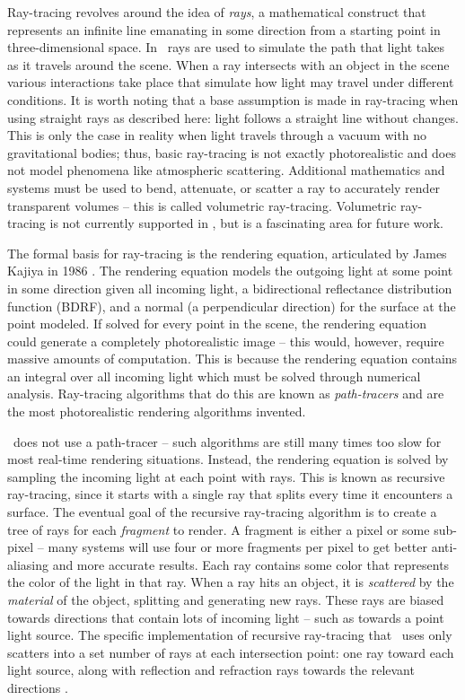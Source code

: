 Ray-tracing revolves around the idea of {\it rays}, a mathematical construct that represents an infinite line emanating in some direction from a starting point in three-dimensional space.
In \name\, rays are used to simulate the path that light takes as it travels around the scene.
When a ray intersects with an object in the scene various interactions take place that simulate how light may travel under different conditions.
It is worth noting that a base assumption is made in ray-tracing when using straight rays as described here: light follows a straight line without changes.
This is only the case in reality when light travels through a vacuum with no gravitational bodies; thus, basic ray-tracing is not exactly photorealistic and does not model phenomena like atmospheric scattering.
Additional mathematics and systems must be used to bend, attenuate, or scatter a ray to accurately render transparent volumes -- this is called volumetric ray-tracing.
Volumetric ray-tracing is not currently supported in \name, but is a fascinating area for future work.

The formal basis for ray-tracing is the rendering equation, articulated by James Kajiya in 1986 \cite{kajiya1986rendering}.
The rendering equation models the outgoing light at some point in some direction given all incoming light, a bidirectional reflectance distribution function (BDRF), and a normal (a perpendicular direction) for the surface at the point modeled.
If solved for every point in the scene, the rendering equation could generate a completely photorealistic image -- this would, however, require massive amounts of computation.
This is because the rendering equation contains an integral over all incoming light which must be solved through numerical analysis.
Ray-tracing algorithms that do this are known as {\it path-tracers} and are the most photorealistic rendering algorithms invented.

\name\ does not use a path-tracer -- such algorithms are still many times too slow for most real-time rendering situations.
Instead, the rendering equation is solved by sampling the incoming light at each point with rays.
This is known as recursive ray-tracing, since it starts with a single ray that splits every time it encounters a surface.
The eventual goal of the recursive ray-tracing algorithm is to create a tree of rays for each {\it fragment} to render.
A fragment is either a pixel or some sub-pixel -- many systems will use four or more fragments per pixel to get better anti-aliasing and more accurate results.
Each ray contains some color that represents the color of the light in that ray.
When a ray hits an object, it is {\it scattered} by the {\it material} of the object, splitting and generating new rays.
These rays are biased towards directions that contain lots of incoming light -- such as towards a point light source.
The specific implementation of recursive ray-tracing that \name\ uses only scatters into a set number of rays at each intersection point: one ray toward each light source, along with reflection and refraction rays towards the relevant directions .

